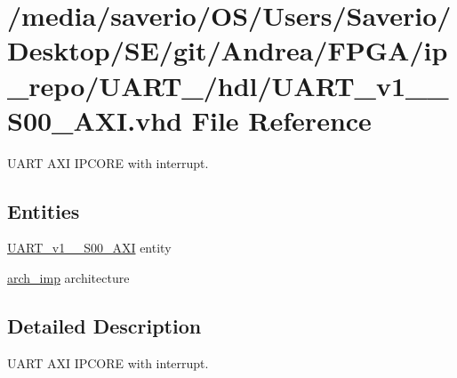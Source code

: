 \hypertarget{UART__v1__0__S00__AXI_8vhd}{}\section{/media/saverio/\+O\+S/\+Users/\+Saverio/\+Desktop/\+S\+E/git/\+Andrea/\+F\+P\+G\+A/ip\+\_\+repo/\+U\+A\+R\+T\+\_/hdl/\+U\+A\+R\+T\+\_\+v1\+\_\+\_\+\+S00\+\_\+\+A\+XI.vhd File Reference}
\label{UART__v1__0__S00__AXI_8vhd}


U\+A\+RT A\+XI I\+P\+C\+O\+RE with interrupt.  


\subsection*{Entities}
\begin{DoxyCompactItemize}
\item 
\hyperlink{classUART__v1__0__S00__AXI}{U\+A\+R\+T\+\_\+v1\+\_\+\_\+\+S00\+\_\+\+A\+XI} entity
\item 
\hyperlink{classUART__v1__0__S00__AXI_1_1arch__imp}{arch\+\_\+imp} architecture
\end{DoxyCompactItemize}


\subsection{Detailed Description}
U\+A\+RT A\+XI I\+P\+C\+O\+RE with interrupt. 

